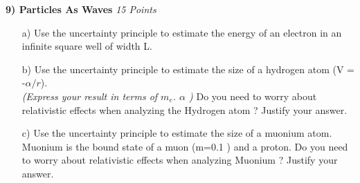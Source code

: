 {\clearpage

\textbf{9) Particles As Waves } \hfill \textit{15 Points}
\begin{itemize}
\item[a)] Use the uncertainty principle to estimate the energy of an electron in an infinite square well of width L.
\vspace*{2.5in}
\item[b)] Use the uncertainty principle to estimate the size of a hydrogen atom (V = -$\alpha/r$). \\ \textit{(Express your result in terms of $m_e$. $\alpha$ )}
          Do you need to worry about relativistic effects when analyzing the Hydrogen atom ?  Justify your answer.
\vspace*{2.5in}
\item[c)] Use the uncertainty principle to estimate the size of a muonium atom. Muonium is the bound state of a muon (m=0.1 \GeV) and a proton.
          Do you need to worry about relativistic effects when analyzing Muonium  ?  Justify your answer. 
\end{itemize}



} %

